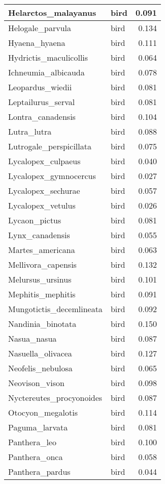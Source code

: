 \begin{table}
\begin{tabular}[t]{l|l|r}
\hline
Helarctos\_malayanus & bird & 0.091\\
\hline
Helogale\_parvula & bird & 0.134\\
\hline
Hyaena\_hyaena & bird & 0.111\\
\hline
Hydrictis\_maculicollis & bird & 0.064\\
\hline
Ichneumia\_albicauda & bird & 0.078\\
\hline
Leopardus\_wiedii & bird & 0.081\\
\hline
Leptailurus\_serval & bird & 0.081\\
\hline
Lontra\_canadensis & bird & 0.104\\
\hline
Lutra\_lutra & bird & 0.088\\
\hline
Lutrogale\_perspicillata & bird & 0.075\\
\hline
Lycalopex\_culpaeus & bird & 0.040\\
\hline
Lycalopex\_gymnocercus & bird & 0.027\\
\hline
Lycalopex\_sechurae & bird & 0.057\\
\hline
Lycalopex\_vetulus & bird & 0.026\\
\hline
Lycaon\_pictus & bird & 0.081\\
\hline
Lynx\_canadensis & bird & 0.055\\
\hline
Martes\_americana & bird & 0.063\\
\hline
Mellivora\_capensis & bird & 0.132\\
\hline
Melursus\_ursinus & bird & 0.101\\
\hline
Mephitis\_mephitis & bird & 0.091\\
\hline
Mungotictis\_decemlineata & bird & 0.092\\
\hline
Nandinia\_binotata & bird & 0.150\\
\hline
Nasua\_nasua & bird & 0.087\\
\hline
Nasuella\_olivacea & bird & 0.127\\
\hline
Neofelis\_nebulosa & bird & 0.065\\
\hline
Neovison\_vison & bird & 0.098\\
\hline
Nyctereutes\_procyonoides & bird & 0.087\\
\hline
Otocyon\_megalotis & bird & 0.114\\
\hline
Paguma\_larvata & bird & 0.081\\
\hline
Panthera\_leo & bird & 0.100\\
\hline
Panthera\_onca & bird & 0.058\\
\hline
Panthera\_pardus & bird & 0.044\\

\end{tabular}
\end{table}
